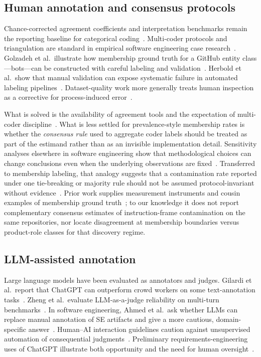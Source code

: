 \subsection{Human annotation and consensus protocols}
\label{subsec:rw-annotation}

Chance-corrected agreement coefficients and interpretation benchmarks remain the reporting baseline for categorical coding~\cite{cohen1960kappa,landis1977kappa}.
Multi-coder protocols and triangulation are standard in empirical software engineering case research~\cite{runeson2009}.
Golzadeh et al.\ illustrate how membership ground truth for a GitHub entity class---bots---can be constructed with careful labeling and validation~\cite{golzadeh2021bots}.
Herbold et al.\ show that manual validation can expose systematic failure in automated labeling pipelines~\cite{herbold2022szz}.
Dataset-quality work more generally treats human inspection as a corrective for process-induced error~\cite{shepperd2013nasa,shepperd2014bias}.

What is solved is the availability of agreement tools and the expectation of multi-coder discipline~\cite{cohen1960kappa,landis1977kappa,runeson2009}.
What is less settled for prevalence-style membership rates is whether the \emph{consensus rule} used to aggregate coder labels should be treated as part of the estimand rather than as an invisible implementation detail.
Sensitivity analyses elsewhere in software engineering show that methodological choices can change conclusions even when the underlying observations are fixed~\cite{tantithamthavorn2017validation}.
Transferred to membership labeling, that analogy suggests that a contamination rate reported under one tie-breaking or majority rule should not be assumed protocol-invariant without evidence~\cite{tantithamthavorn2017validation,baltes2022sampling}.
Prior work supplies measurement instruments and cousin examples of membership ground truth~\cite{golzadeh2021bots,herbold2022szz}; to our knowledge it does not report complementary consensus estimates of instruction-frame contamination on the same repositories, nor locate disagreement at membership boundaries versus product-role classes for that discovery regime.

\subsection{LLM-assisted annotation}
\label{subsec:rw-llm-annotation}

Large language models have been evaluated as annotators and judges.
Gilardi et al.\ report that ChatGPT can outperform crowd workers on some text-annotation tasks~\cite{gilardi2023chatgpt}.
Zheng et al.\ evaluate LLM-as-a-judge reliability on multi-turn benchmarks~\cite{zheng2023judge}.
In software engineering, Ahmed et al.\ ask whether LLMs can replace manual annotation of SE artifacts and give a more cautious, domain-specific answer~\cite{ahmed2025llms}.
Human--AI interaction guidelines caution against unsupervised automation of consequential judgments~\cite{amershi2019humanai}.
Preliminary requirements-engineering uses of ChatGPT illustrate both opportunity and the need for human oversight~\cite{fantechi2023}.

